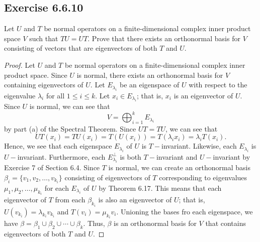 \subsection*{Exercise 6.6.10} Let \( U \) and \( T  \) be normal operators on a finite-dimensional complex inner product space \( V  \) such that \( TU = UT  \). Prove that there exists an orthonormal basis for \( V  \) consisting of vectors that are eigenvectors of both \( T  \) and \( U  \).
\begin{proof}
Let \( U  \) and \( T  \) be normal operators on a finite-dimensional complex inner product space. Since \( U  \) is normal, there exists an orthonormal basis for \( V  \) containing eigenvectors of \( U  \). Let \( {E}_{{\lambda}_{i}} \) be an eigenspace of \( U  \) with respect to the eigenvalue \( {\lambda}_{i} \) for all \( 1 \leq i \leq k  \). Let \( {x}_{i} \in {E}_{{\lambda}_{i}} \); that is, \( {x}_{i} \) is an eigenvector of \( U \). Since \( U  \) is normal, we can see that
\[  V = \bigoplus_{i=1}^{k} {E}_{{\lambda}_{i}} \]
by part (a) of the Spectral Theorem. Since \( UT = TU  \), we can see that  
\[  UT({x}_{i}) = TU({x}_{i}) = T(U({x}_{i})) = T({\lambda}_{i} {x}_{i}) = {\lambda}_{i} T({x}_{i}). \]
Hence, we see that each eigenspace \( {E}_{{\lambda}_{i}} \) of \( U \) is \( T- \)invariant. Likewise, each \( {E}_{{\lambda}_{i}} \) is \( U- \)invariant. Furthermore, each \( {E}_{{\lambda}_{i}}^{\perp} \) is both \( T- \)invariant and \( U- \)invariant by Exercise 7 of Section 6.4. Since \( T \) is normal, we can create an orthonormal basis \( \beta_i = \{ {v}_{1}, {v}_{2}, \dots, {v}_{{k}_{i}} \}  \) consisting of eigenvectors of \( T  \) corresponding to eigenvalues \( {\mu}_{1}, {\mu}_{2}, \dots, {\mu}_{{k}_{i}} \) for each \( {E}_{{\lambda}_{i}} \) of \( U \) by Theorem 6.17. This means that each eigenvector of \( T  \) from each \( {\beta}_{{k}_{i}} \) is also an eigenvector of \( U  \); that is, \( U({v}_{{k}_{i}}) = \lambda_{{k}_{i}} {v}_{{k}_{i}} \) and \( T({v}_{i}) = {\mu}_{{k}_{i}} {v}_{i} \). Unioning the bases fro each eigenspace, we have \( \beta = {\beta}_{1} \cup {\beta}_{2} \cup \cdots \cup {\beta}_{k}  \). Thus, \( \beta \) is an orthonormal basis for \( V  \) that contains eigenvectors of both \( T \) and \( U  \).  
\end{proof}

